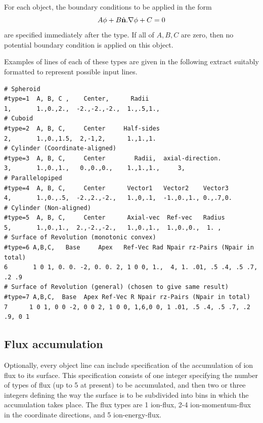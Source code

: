 \documentclass[12pt]{article}
\begin{document}
\bigskip
For each object, the boundary conditions to be applied in the form 
$$A\phi + B \hat{\bf n}.\nabla\phi + C =0$$
are specified immediately after the type. If all of $A,B,C$ are zero,
then no potential boundary condition is applied on this object.

Examples of lines of each of these types are given in the following
extract suitably formatted to represent possible input lines.

\begin{verbatim}
# Spheroid
#type=1  A, B, C ,    Center,      Radii
1,       1.,0.,2.,  -2.,-2.,-2.,  1.,.5,1., 
# Cuboid
#type=2  A, B, C,     Center     Half-sides
2,       1.,0.,1.5,  2,-1,2,      1.,1.,1.
# Cylinder (Coordinate-aligned)
#type=3  A, B, C,     Center        Radii,  axial-direction. 
3,       1.,0.,1.,   0.,0.,0.,    1.,1.,1.,     3,
# Parallelopiped
#type=4  A, B, C,     Center      Vector1   Vector2    Vector3
4,       1.,0.,.5,  -2.,2.,-2.,   1.,0,.1,  -1.,0.,1., 0.,.7,0.
# Cylinder (Non-aligned)
#type=5  A, B, C,     Center      Axial-vec  Ref-vec   Radius
5,       1.,0.,1.,  2.,-2.,-2.,   1.,0.,1.,  1.,0.,0.,  1. ,
# Surface of Revolution (monotonic convex)
#type=6 A,B,C,   Base     Apex   Ref-Vec Rad Npair rz-Pairs (Npair in total)
6       1 0 1, 0. 0. -2, 0. 0. 2, 1 0 0, 1.,  4, 1. .01, .5 .4, .5 .7, .2 .9
# Surface of Revolution (general) (chosen to give same result)
#type=7 A,B,C,  Base  Apex Ref-Vec R Npair rz-Pairs (Npair in total)
7      1 0 1, 0 0 -2, 0 0 2, 1 0 0, 1,6,0 0, 1 .01, .5 .4, .5 .7, .2 .9, 0 1

\end{verbatim}

\subsection{Flux accumulation}

Optionally, every object line can include specification of the
accumulation of ion flux to its surface. This specification consists
of one integer specifying the number of types of flux (up to 5 at
present) to be accumulated, and then two or three integers defining
the way the surface is to be subdivided into bins in which the
accumulation takes place. The flux types are 1 ion-flux, 2-4
ion-momentum-flux in the coordinate directions, and 5 ion-energy-flux.
\end{document}
